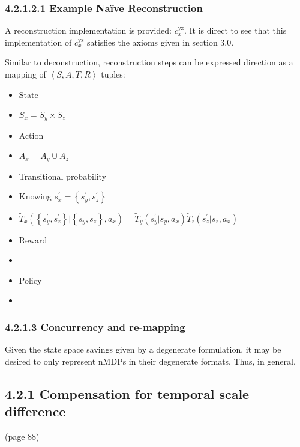 \documentclass[compsoc,journal,letterpaper,10pt,draftclsnofoot,onecolumn]{IEEEtran}
\begin{document}
 
\subsubsection{4.2.1.2.1 Example Naïve
Reconstruction}\label{example-nauxefve-reconstruction}

A reconstruction implementation is provided: \(c_{x}^{\text{yz}}\). It
is direct to see that this implementation of \(c_{x}^{\text{yz}}\)
satisfies the axioms given in section 3.0.

Similar to deconstruction, reconstruction steps can be expressed
direction as a mapping of \(\left\langle S,A,T,R \right\rangle\) tuples:

\begin{itemize}
\item
  State
\item
  \(S_{x} = S_{y} \times S_{z}\)
\item
  Action
\item
  \(A_{x} = A_{y} \cup A_{z}\)
\item
  Transitional probability
\item
  Knowing \(s_{x}^{'} = \left\{ s_{y}^{'},s_{z}^{'} \right\}\)
\item
  \({\tilde{T}}_{x}\left( \left\{ s_{y}^{'},s_{z}^{'} \right\}|\left\{ s_{y}^{\ },s_{z}^{\ } \right\},a_{x} \right) = {\tilde{T}}_{y}\left( s_{y}^{'}|s_{y}^{\ },a_{x} \right){\tilde{T}}_{z}\left( s_{z}^{'}|s_{z}^{\ },a_{x} \right)\)
\item
  Reward
\item
\item
  Policy
\item
\end{itemize} 

\subsubsection{4.2.1.3 Concurrency and
re-mapping}\label{concurrency-and-re-mapping}

Given the state space savings given by a degenerate formulation, it may
be desired to only represent nMDPs in their degenerate formats. Thus, in
general,

\subsection{4.2.1 Compensation for temporal scale
difference}\label{compensation-for-temporal-scale-difference}

(page 88)
\end{document}
